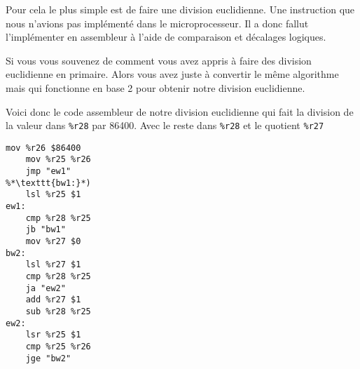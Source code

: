 \documentclass[10pt,a4paper,notitlepage ]{report}
\begin{document}
			Pour cela le plus simple est de faire une division euclidienne. Une instruction que nous n'avions pas implémenté dans le microprocesseur. Il a donc fallut l'implémenter en assembleur à l'aide de comparaison et décalages logiques.

			Si vous vous souvenez de comment vous avez appris à faire des division euclidienne en primaire. Alors vous avez juste à convertir le même algorithme mais qui fonctionne en base 2 pour obtenir notre division euclidienne.

			Voici donc le code assembleur de notre division euclidienne qui fait la division de la valeur dans \texttt{\%r28} par 86400. Avec le reste dans \texttt{\%r28} et le quotient \texttt{\%r27}

\begin{lstlisting}[language={[x86masm]Assembler},morekeywords={lsr}]
	mov %r26 $86400
	mov %r25 %r26
	jmp "ew1"
%*\texttt{bw1:}*)
	lsl %r25 $1
ew1:
	cmp %r28 %r25
	jb "bw1"
	mov %r27 $0
bw2:
	lsl %r27 $1
	cmp %r28 %r25
	ja "ew2"
	add %r27 $1
	sub %r28 %r25
ew2:
	lsr %r25 $1
	cmp %r25 %r26
	jge "bw2"

\end{lstlisting}
	
\end{document}
